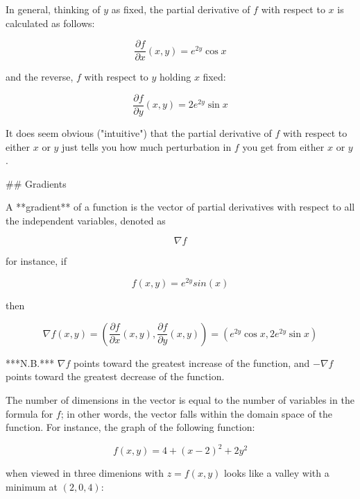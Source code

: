 \begin{markdown}
\begin{definition}
In general, thinking of $y$ as fixed, the partial derivative of $f$ with respect
to $x$ is calculated as follows:

\begin{equation}
    \frac{\partial f}{\partial x}(x,y) = e^{2y}\cos{x}
\end{equation}

and the reverse, $f$ with respect to $y$ holding $x$ fixed:

\begin{equation}
    \frac{\partial f}{\partial y}(x,y) = 2e^{2y}\sin{x}
\end{equation}

It does seem obvious ("intuitive") that the partial derivative of $f$ with
respect to either $x$ or $y$ just tells you how much perturbation in $f$ you get
from either $x$ or $y$.

## Gradients

A **gradient** of a function is the vector of partial derivatives with respect
to all the independent variables, denoted as

\begin{equation}
    \nabla f
\end{equation}

for instance, if

\begin{equation}
    f(x,y) = e^{2y}sin(x)
\end{equation}

then

\begin{equation}
    \nabla f(x,y) =
    \left( \frac{\partial f}{\partial x}(x,y), \frac{\partial f}{\partial y}(x,y) \right) =
    (e^{2y}\cos{x}, 2e^{2y}\sin{x})
\end{equation}

***N.B.*** $\nabla f$ points toward the greatest increase of the function, and
$-\nabla f$ points toward the greatest decrease of the function.

The number of dimensions in the vector is equal to the number of variables in
the formula for $f$; in other words, the vector falls within the domain space of
the function. For instance, the graph of the following function:

\begin{equation}
    f(x,y) = 4 + (x - 2)^2 + 2y^2
\end{equation}

when viewed in three dimenions with $z = f(x,y)$ looks like a valley with a
minimum at $(2,0,4)$:


\end{definition}
\end{markdown}

